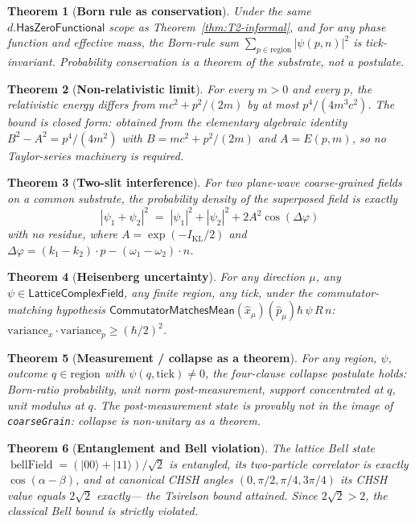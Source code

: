 \documentclass[11pt,a4paper,twoside]{article}
\newtheorem{theorem}{Theorem}[section]
\theoremstyle{definition}
\newcommand{\KL}{I_{\mathrm{KL}}}
\newcommand{\HasZF}{\mathsf{HasZeroFunctional}}
\newcommand{\CMM}{\mathsf{CommutatorMatchesMean}}
\newcommand{\xhat}{\hat{x}}
\newcommand{\phat}{\hat{p}}
\newcommand{\Lfield}{\mathsf{LatticeComplexField}}
\newcommand{\code}[1]{\texttt{#1}}
\newcommand{\BellField}{\operatorname{bellField}}
\begin{document}
\begin{theorem}[\textbf{Born rule as conservation}]\label{thm:T3-informal}
Under the same $d.\HasZF$ scope as Theorem~\ref{thm:T2-informal}, and
for \emph{any} phase function and effective mass, the Born-rule sum
$\sum_{p\in\mathrm{region}}|\psi(p,n)|^{2}$ is tick-invariant.
Probability conservation is a \emph{theorem} of the substrate, not a
postulate.
\end{theorem}

\begin{theorem}[\textbf{Non-relativistic limit}]\label{thm:T4-informal}
For every $m>0$ and every $p$, the relativistic energy differs from
$mc^{2}+p^{2}/(2m)$ by at most $p^{4}/(4m^{3}c^{2})$. The bound is
\emph{closed form}: obtained from the elementary algebraic identity
$B^{2}-A^{2}=p^{4}/(4m^{2})$ with $B=mc^{2}+p^{2}/(2m)$ and
$A=E(p,m)$, so no Taylor-series machinery is required.
\end{theorem}

\begin{theorem}[\textbf{Two-slit interference}]\label{thm:T5-informal}
For two plane-wave coarse-grained fields on a common substrate, the
probability density of the superposed field is \emph{exactly}
\[
|\psi_{1}+\psi_{2}|^{2}
 \;=\; |\psi_{1}|^{2}+|\psi_{2}|^{2}+2A^{2}\cos(\Delta\varphi)
\]
with no residue, where $A=\exp(-\KL/2)$ and
$\Delta\varphi=(k_{1}-k_{2})\cdot p-(\omega_{1}-\omega_{2})\cdot n$.
\end{theorem}

\begin{theorem}[\textbf{Heisenberg uncertainty}]\label{thm:T6-informal}
For any direction $\mu$, any $\psi\in\Lfield$, any finite region, any
tick, under the commutator-matching hypothesis
$\CMM(\xhat_{\mu})(\phat_{\mu})\hbar\,\psi\,R\,n$:
$\mathrm{variance}_{x}\cdot\mathrm{variance}_{p}\ge(\hbar/2)^{2}$.
\end{theorem}

\begin{theorem}[\textbf{Measurement / collapse as a theorem}]\label{thm:T7-informal}
For any region, $\psi$, outcome $q\in\mathrm{region}$ with
$\psi(q,\mathrm{tick})\ne 0$, the four-clause collapse postulate
holds: Born-ratio probability, unit norm post-measurement, support
concentrated at $q$, unit modulus at $q$. The post-measurement state
is \emph{provably not} in the image of \code{coarseGrain}: collapse
is non-unitary \emph{as a theorem}.
\end{theorem}

\begin{theorem}[\textbf{Entanglement and Bell violation}]\label{thm:T8-informal}
The lattice Bell state $\BellField=(|00\rangle+|11\rangle)/\sqrt{2}$
is entangled, its two-particle correlator is exactly
$\cos(\alpha-\beta)$, and at canonical CHSH angles
$(0,\pi/2,\pi/4,3\pi/4)$ its CHSH value equals $2\sqrt{2}$ exactly---
the Tsirelson bound attained. Since $2\sqrt{2}>2$, the classical
Bell bound is strictly violated.
\end{theorem}
\end{document}

